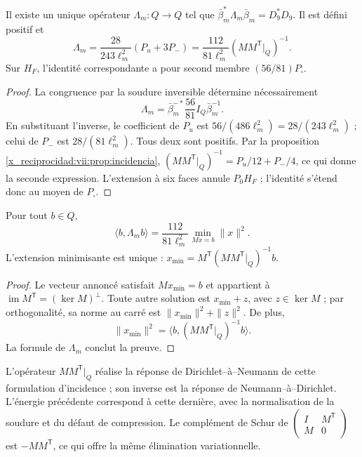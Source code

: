 \begin{theorem}
\label{x_reciprocidad:vii:thm:respuesta-unica}
Il existe un unique opérateur \(\Lambda_m:Q\longrightarrow Q\) tel que
\(\bar\beta_m^*\Lambda_m\bar\beta_m=D_9^*D_9\). Il est défini positif et
\begin{equation}
 \Lambda_m=\frac{28}{243\ell_m^2}(P_u+3P_-)
 =\frac{112}{81\ell_m^2}
       (MM^{\mathsf T}|_Q)^{-1}.
 \label{x_reciprocidad:vii:eq:lambda-pantalla}
\end{equation}
Sur \(H_F\), l'identité correspondante a pour second membre
\((56/81)P_\square\).
\end{theorem}

\begin{proof}
La congruence par la soudure inversible détermine nécessairement
\[
 \Lambda_m=\bar\beta_m^{-*}\frac{56}{81}I_Q\bar\beta_m^{-1}.
\]
En substituant l'inverse, le coefficient de \(P_u\) est \(56/(486\ell_m^2)=28/(243\ell_m^2)\) ; celui de \(P_-\) est \(28/(81\ell_m^2)\). Tous deux sont positifs. Par la proposition \ref{x_reciprocidad:vii:prop:incidencia}, \((MM^{\mathsf T}|_Q)^{-1}=P_u/12+P_-/4\), ce qui donne la seconde expression. L'extension à six faces annule \(P_0H_F\) ; l'identité s'étend donc au moyen de \(P_\square\).
\end{proof}

\begin{proposition}
\label{x_reciprocidad:vii:prop:minima-extension}
Pour tout \(b\in Q\),
\[
 \langle b,\Lambda_m b\rangle
 =\frac{112}{81\ell_m^2}
   \min_{Mx=b}\|x\|^2.
\]
L'extension minimisante est unique :
\(x_{\min}=M^{\mathsf T}(MM^{\mathsf T}|_Q)^{-1}b\).
\end{proposition}

\begin{proof}
Le vecteur annoncé satisfait \(Mx_{\min}=b\) et appartient à
\(\operatorname{im}M^{\mathsf T}=(\ker M)^\perp\).
Toute autre solution est \(x_{\min}+z\), avec \(z\in\ker M\) ; par
orthogonalité, sa norme au carré est \(\|x_{\min}\|^2+\|z\|^2\).
De plus,
\[
 \|x_{\min}\|^2
 =\langle b,(MM^{\mathsf T}|_Q)^{-1}b\rangle.
\]
La formule de \(\Lambda_m\) conclut la preuve.
\end{proof}

L'opérateur \(MM^{\mathsf T}|_Q\) réalise la réponse
de Dirichlet--à--Neumann de cette formulation d'incidence ; son inverse
est la réponse de Neumann--à--Dirichlet. L'énergie précédente correspond
à cette dernière, avec la normalisation de la soudure et du défaut de
compression. Le complément de Schur de
\(\left(\begin{smallmatrix}I&M^{\mathsf T}\\M&0\end{smallmatrix}\right)\)
est \(-MM^{\mathsf T}\), ce qui offre la même élimination variationnelle.

